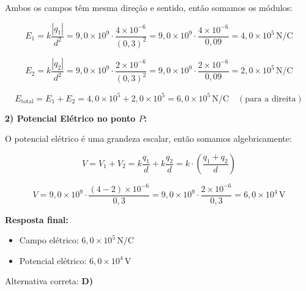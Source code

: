\documentclass[a4paper,12pt]{article}
\begin{document}
\begin{flushleft}
Ambos os campos têm mesma direção e sentido, então somamos os módulos:

\[
E_1 = k \frac{|q_1|}{d^2} = 9{,}0 \times 10^9 \cdot \frac{4 \times 10^{-6}}{(0{,}3)^2}
= 9{,}0 \times 10^9 \cdot \frac{4 \times 10^{-6}}{0{,}09}
= 4{,}0 \times 10^5\,\text{N/C}
\]

\[
E_2 = k \frac{|q_2|}{d^2} = 9{,}0 \times 10^9 \cdot \frac{2 \times 10^{-6}}{(0{,}3)^2}
= 9{,}0 \times 10^9 \cdot \frac{2 \times 10^{-6}}{0{,}09}
= 2{,}0 \times 10^5\,\text{N/C}
\]

\[
E_{\text{total}} = E_1 + E_2 = 4{,}0 \times 10^5 + 2{,}0 \times 10^5 = 6{,}0 \times 10^5\,\text{N/C} \quad (\text{para a direita})
\]

\vspace{0.5cm}
\textbf{2) Potencial Elétrico no ponto \( P \):}

O potencial elétrico é uma grandeza escalar, então somamos algebricamente:

\[
V = V_1 + V_2
= k \frac{q_1}{d} + k \frac{q_2}{d}
= k \cdot \left( \frac{q_1 + q_2}{d} \right)
\]

\[
V = 9{,}0 \times 10^9 \cdot \frac{(4 - 2) \times 10^{-6}}{0{,}3}
= 9{,}0 \times 10^9 \cdot \frac{2 \times 10^{-6}}{0{,}3}
= 6{,}0 \times 10^4\,\text{V}
\]

\vspace{0.5cm}
\textbf{Resposta final:}

\begin{itemize}
    \item Campo elétrico: \( \boxed{6{,}0 \times 10^5\,\text{N/C}} \)
    \item Potencial elétrico: \( \boxed{6{,}0 \times 10^4\,\text{V}} \)
\end{itemize}

Alternativa correta: \colorbox{green!50}{\textbf{D)}}

\end{flushleft}
\end{document}
